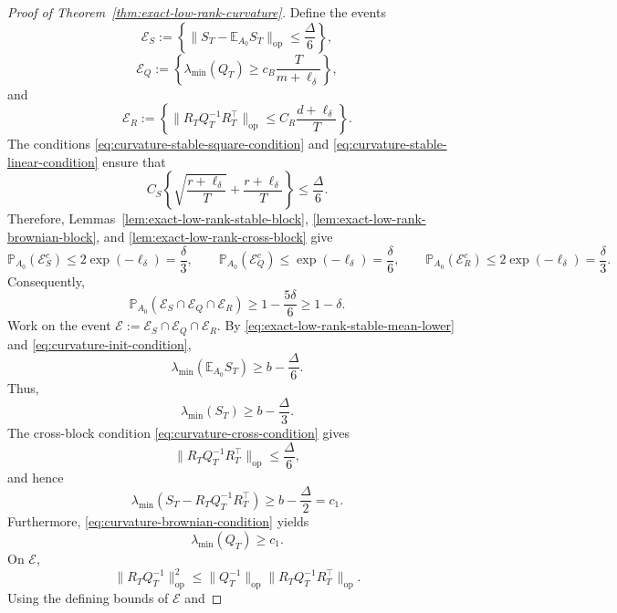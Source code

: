 \documentclass[11pt]{article}
\begin{document}
\begin{proof}[Proof of Theorem~\ref{thm:exact-low-rank-curvature}]
Define the events
\[
    \mathcal E_S
    :=\left\{
        \|S_T-\mathbb E_{A_0}S_T\|_{\mathrm{op}}
        \leq\frac{\Delta}{6}
    \right\},
\]
\[
    \mathcal E_Q
    :=\left\{
        \lambda_{\min}(Q_T)
        \geq c_B\frac{T}{m+\ell_\delta}
    \right\},
\]
and
\[
    \mathcal E_R
    :=\left\{
        \|R_TQ_T^{-1}R_T^\top\|_{\mathrm{op}}
        \leq C_R\frac{d+\ell_\delta}{T}
    \right\}.
\]
The conditions \eqref{eq:curvature-stable-square-condition} and
\eqref{eq:curvature-stable-linear-condition} ensure that
\[
    C_S\left\{
        \sqrt{\frac{r+\ell_\delta}{T}}
        +\frac{r+\ell_\delta}{T}
    \right\}
    \leq\frac{\Delta}{6}.
\]
Therefore, Lemmas~\ref{lem:exact-low-rank-stable-block},
\ref{lem:exact-low-rank-brownian-block}, and
\ref{lem:exact-low-rank-cross-block} give
\[
    \mathbb P_{A_0}(\mathcal E_S^c)\leq2\exp(-\ell_\delta)=\frac{\delta}{3},
    \qquad
    \mathbb P_{A_0}(\mathcal E_Q^c)\leq \exp(-\ell_\delta)=\frac{\delta}{6},
    \qquad
    \mathbb P_{A_0}(\mathcal E_R^c)\leq2\exp(-\ell_\delta)=\frac{\delta}{3}.
\]
Consequently,
\begin{equation}
    \mathbb P_{A_0}(\mathcal E_S\cap\mathcal E_Q\cap\mathcal E_R)
    \geq1-\frac{5\delta}{6}
    \geq1-\delta.
\label{eq:exact-low-rank-good-event-probability}
\end{equation}
Work on the event
$\mathcal E:=\mathcal E_S\cap\mathcal E_Q\cap\mathcal E_R$. By
\eqref{eq:exact-low-rank-stable-mean-lower} and
\eqref{eq:curvature-init-condition},
\[
    \lambda_{\min}\!\left(\mathbb E_{A_0}S_T\right)
    \geq b-\frac{\Delta}{6}.
\]
Thus,
\[
    \lambda_{\min}(S_T)\geq b-\frac{\Delta}{3}.
\]
The cross-block condition \eqref{eq:curvature-cross-condition} gives
\[
    \|R_TQ_T^{-1}R_T^\top\|_{\mathrm{op}}
    \leq\frac{\Delta}{6},
\]
and hence
\begin{equation}
    \lambda_{\min}\!\left(
        S_T-R_TQ_T^{-1}R_T^\top
    \right)
    \geq b-\frac{\Delta}{2}=c_1.
\label{eq:exact-low-rank-schur-lower}
\end{equation}
Furthermore, \eqref{eq:curvature-brownian-condition} yields
\begin{equation}
    \lambda_{\min}(Q_T)\geq c_1.
\label{eq:exact-low-rank-Q-lower}
\end{equation}
On $\mathcal E$,
\[
    \|R_TQ_T^{-1}\|_{\mathrm{op}}^2
    \leq
    \|Q_T^{-1}\|_{\mathrm{op}}
    \|R_TQ_T^{-1}R_T^\top\|_{\mathrm{op}}.
\]
Using the defining bounds of $\mathcal E$ and

\end{proof}
\end{document}
